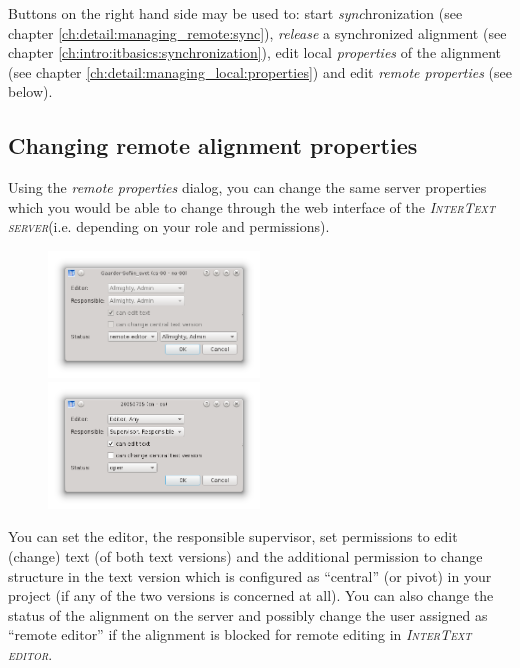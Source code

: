 \documentclass[a4paper,10pt,oneside]{book}
\newcommand{\ITeditor}{\textit{\textsc{InterText editor}}\xspace}
\newcommand{\ITserver}{\textit{\textsc{InterText server}}\xspace}
\begin{document}
Buttons on the right hand side may be used to: start \emph{sync}hronization (see chapter \ref{ch:detail:managing_remote:sync}), \emph{release} a synchronized alignment (see chapter \ref{ch:intro:itbasics:synchronization}), edit local \emph{properties} of the alignment (see chapter \ref{ch:detail:managing_local:properties}) and edit \emph{remote properties} (see below).

\subsection{Changing remote alignment properties}\label{ch:detail:managing_remote:remote_properties}

Using the \emph{remote properties} dialog, you can change the same server properties which you would be able to change through the web interface of the \ITserver (i.e. depending on your role and permissions).

\begin{figure}[htbf]
 \includegraphics[width=0.5\textwidth]{screenshots/remote_props1.png}
 \includegraphics[width=0.5\textwidth]{screenshots/remote_props2.png}
\end{figure}

You can set the editor, the responsible supervisor, set permissions to edit (change) text (of both text versions) and the additional permission to change structure in the text version which is configured as ``central'' (or pivot) in your project (if any of the two versions is concerned at all). You can also change the status of the alignment on the server and possibly change the user assigned as ``remote editor'' if the alignment is blocked for remote editing in \ITeditor.
\end{document}
